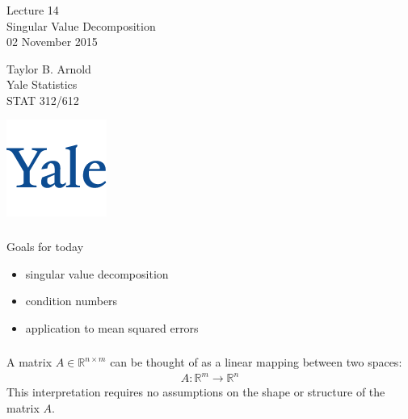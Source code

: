 



\begin{frame}[fragile] \frametitle{}

\vfill

{\fontsize{0.7cm}{0cm}\selectfont Lecture 14 \\\vspace{0.2cm}
Singular Value Decomposition}\\\vspace{0.5cm}
02 November 2015

\vspace{2cm}

\begin{minipage}{0.6\textwidth}
Taylor B. Arnold \\
Yale Statistics \\
STAT 312/612
\end{minipage}
\hfill
\begin{minipage}{0.3\textwidth}\raggedleft
\includegraphics[scale=0.3]{../yale-logo.png}
\end{minipage}%

\end{frame}

\begin{frame}[fragile] \frametitle{}

{\color{yaleblue}\fontsize{16pt}{20pt}\selectfont Goals for today}

\begin{itemize}
\item singular value decomposition
\item condition numbers
\item application to mean squared errors
\end{itemize}

\end{frame}

\begin{frame}[fragile] \frametitle{}

A matrix $A \in \mathbb{R}^{n \times m}$ can be thought of as
a linear mapping between two spaces:
\begin{align*}
A: \mathbb{R}^m \rightarrow \mathbb{R}^n
\end{align*}
This interpretation requires no assumptions on the shape or
structure of the matrix $A$.

\end{frame}

